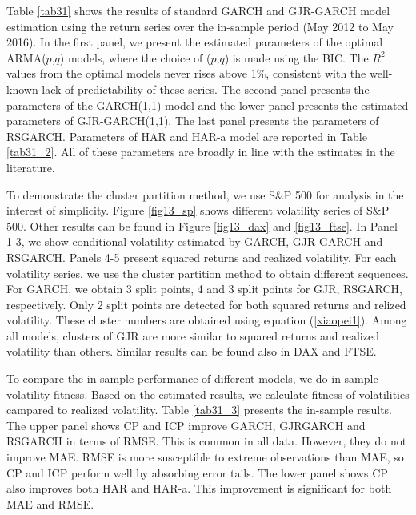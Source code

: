 \documentclass[preprint,12pt,authoryear]{elsarticle}
\begin{document}
Table \ref{tab31} shows the results of standard GARCH and GJR-GARCH model estimation using the return series over the in-sample period (May 2012 to May 2016). In the first panel, we present the estimated parameters of the optimal ARMA($p$,$q$) models, where the choice of ($p$,$q$) is made using the BIC. The $R^2$ values from the optimal models never rises above 1\%, consistent with the well-known lack of predictability of these series. The second panel presents the parameters of the GARCH(1,1) model and the lower panel presents the estimated parameters of GJR-GARCH(1,1). The last panel presents the parameters of RSGARCH.
Parameters of HAR and HAR-a model are reported in Table \ref{tab31_2}.
All of these parameters are broadly in line with the estimates in the literature.

To demonstrate the cluster partition method, we use S\&P 500 for analysis in the interest of simplicity.
Figure \ref{fig13_sp} shows different volatility series of S\&P 500. Other results can be found in Figure \ref{fig13_dax} and \ref{fig13_ftse}.
In Panel 1-3, we show conditional volatility estimated by GARCH, GJR-GARCH and RSGARCH. Panels 4-5 present squared returns and realized volatility. For each volatility series, we use the cluster partition method to obtain different sequences. For GARCH, we obtain 3 split points, 4 and 3 split points for GJR, RSGARCH, respectively. Only 2 split points are detected for both squared returns and relized volatility.
These cluster numbers are obtained using equation (\ref{xiaopei1}).
Among all models, clusters of GJR are more similar to squared returns and realized volatility than others.
Similar results can be found also in DAX and FTSE.

To compare the in-sample performance of different models, we do in-sample volatility fitness.
Based on the estimated results, we calculate fitness of volatilities campared to realized volatility.
Table \ref{tab31_3} presents the in-sample results. The upper panel shows CP and ICP improve GARCH, GJRGARCH and RSGARCH in terms of RMSE. This is common in all data. However, they do not improve MAE. {\color{red} RMSE is more susceptible to extreme observations than MAE, so CP and ICP perform well by absorbing error tails.} The lower panel shows CP also improves both HAR and HAR-a. This improvement is significant for both MAE and RMSE.
\end{document}

